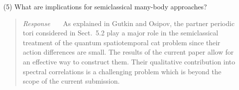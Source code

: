 \documentclass[12pt]{iopart}
\begin{document}
\begin{enumerate}
\begin{quote}
{\em Response~~~}
    No, with $s$ defined in , the {\catlatt} is chaotic
    for $s>2$ in all $d$.
\end{quote}

  \item[(5)]
 What are implications for semiclassical many-body approaches?

\begin{quote}
{\em Response~~~}
As explained in Gutkin and Osipov, the partner
periodic tori considered in Sect.~5.2 play a major role in the
semiclassical treatment of the  quantum spatiotemporal  cat problem since
their action differences are small.    The results of the current paper
allow for an effective way to construct them. Their  qualitative
contribution into spectral correlations  is a challenging  problem which
is beyond the scope of the current submission.
\end{quote}
\end{enumerate}

\printbibliography[
heading=bibintoc,
title={References}
				  ] %
\end{document}
